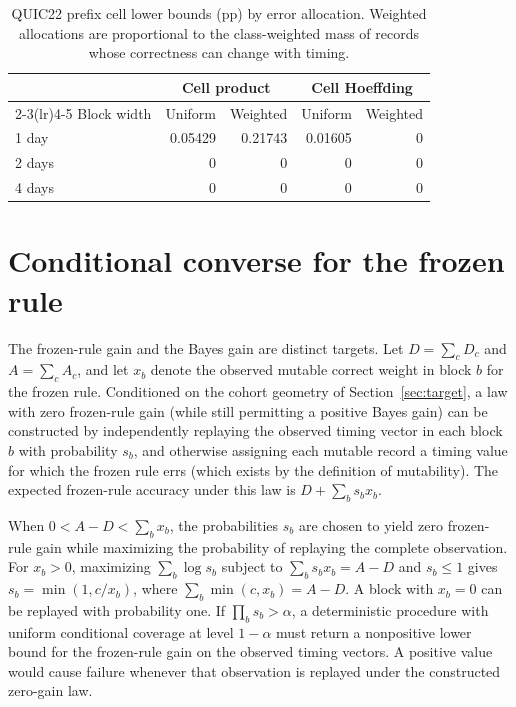 \documentclass[preprint,11pt]{elsarticle}
\begin{document}
\begin{table}[!ht]
\centering
\small
\setlength{\tabcolsep}{5pt}
\caption{QUIC22 prefix cell lower bounds (pp) by error allocation. Weighted allocations are proportional to the class-weighted mass of records whose correctness can change with timing.}
\label{tab:weighted-cells}
\begin{tabular}{lrrrr}
\toprule
 & \multicolumn{2}{c}{Cell product} & \multicolumn{2}{c}{Cell Hoeffding} \\
\cmidrule(lr){2-3}\cmidrule(lr){4-5}
Block width & Uniform & Weighted & Uniform & Weighted \\
\midrule
1 day  & 0.05429 & 0.21743 & 0.01605 & 0 \\
2 days & 0 & 0 & 0 & 0 \\
4 days & 0 & 0 & 0 & 0 \\
\bottomrule
\end{tabular}
\end{table}

\FloatBarrier

\section{Conditional converse for the frozen rule}
\label{app:frozen-converse}

The frozen-rule gain and the Bayes gain are distinct targets. Let $D=\sum_c D_c$ and $A=\sum_c A_c$, and let $x_b$ denote the observed mutable correct weight in block $b$ for the frozen rule. Conditioned on the cohort geometry of Section~\ref{sec:target}, a law with zero frozen-rule gain (while still permitting a positive Bayes gain) can be constructed by independently replaying the observed timing vector in each block $b$ with probability $s_b$, and otherwise assigning each mutable record a timing value for which the frozen rule errs (which exists by the definition of mutability). The expected frozen-rule accuracy under this law is $D+\sum_b s_bx_b$.

When $0<A-D<\sum_b x_b$, the probabilities $s_b$ are chosen to yield zero frozen-rule gain while maximizing the probability of replaying the complete observation. For $x_b>0$, maximizing $\sum_b\log s_b$ subject to $\sum_b s_bx_b=A-D$ and $s_b\le1$ gives $s_b=\min(1,c/x_b)$, where $\sum_b\min(c,x_b)=A-D$. A block with $x_b=0$ can be replayed with probability one. If $\prod_b s_b>\alpha$, a deterministic procedure with uniform conditional coverage at level $1-\alpha$ must return a nonpositive lower bound for the frozen-rule gain on the observed timing vectors. A positive value would cause failure whenever that observation is replayed under the constructed zero-gain law.
\end{document}
